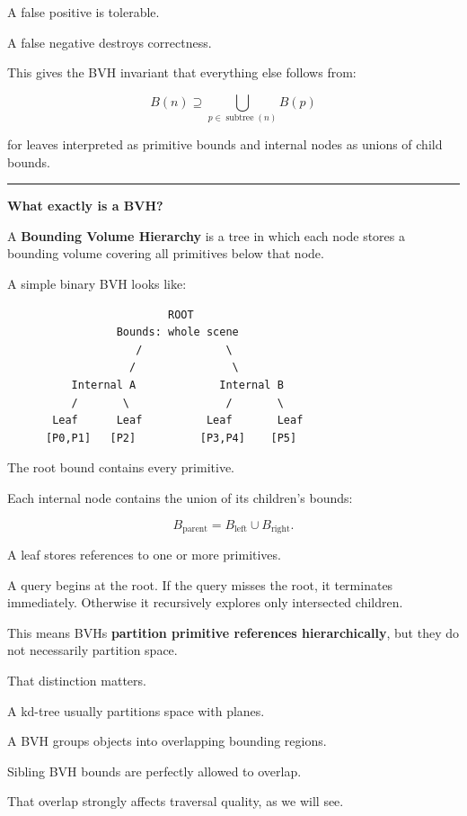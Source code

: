 A false positive is tolerable.

A false negative destroys correctness.

This gives the BVH invariant that everything else follows from:

\[
\boxed{
B(n)\supseteq
\bigcup_{p\in\operatorname{subtree}(n)} B(p)
}
\]

for leaves interpreted as primitive bounds and internal nodes as unions of child bounds.

\begin{center}\rule{0.5\linewidth}{0.5pt}\end{center}

\textbf{What exactly is a BVH?}

A \textbf{Bounding Volume Hierarchy} is a tree in which each node stores a bounding volume covering all primitives below that node.

A simple binary BVH looks like:

\begin{verbatim}
                         ROOT
                 Bounds: whole scene
                    /             \
                   /               \
          Internal A             Internal B
          /       \               /       \
       Leaf      Leaf          Leaf       Leaf
      [P0,P1]   [P2]          [P3,P4]    [P5]
\end{verbatim}

The root bound contains every primitive.

Each internal node contains the union of its children's bounds:

\[
B_{\text{parent}}
=
B_{\text{left}}\cup B_{\text{right}}.
\]

A leaf stores references to one or more primitives.

A query begins at the root. If the query misses the root, it terminates immediately. Otherwise it recursively explores only intersected children.

This means BVHs \textbf{partition primitive references hierarchically}, but they do not necessarily partition space.

That distinction matters.

A kd-tree usually partitions space with planes.

A BVH groups objects into overlapping bounding regions.

Sibling BVH bounds are perfectly allowed to overlap.

That overlap strongly affects traversal quality, as we will see.

